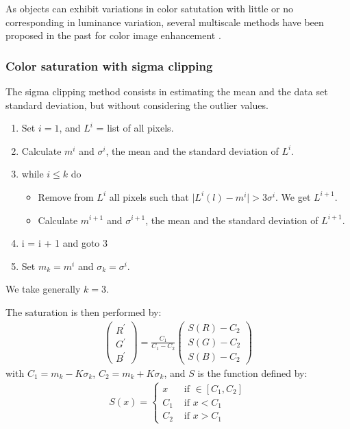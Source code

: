 As objects can exhibit variations in color satutation
with little or no corresponding in luminance variation, 
several multiscale methods have been proposed in the past for color image
enhancement \cite{col:toet92}.
 
\subsubsection*{Color saturation with sigma clipping}
The sigma clipping method consists in estimating the mean and the 
data set standard deviation, but without considering the outlier 
values. 
\begin{enumerate}
\item  Set $i=1$, and $L^i$ = list of all pixels.
\item  Calculate $m^i$ and $\sigma^i$, the mean 
       and the standard deviation of $L^i$.
\item  while $i \le k$ do
\begin{itemize}
\item Remove from $L^i$ all pixels such that $ \mid L^i(l) - m^i \mid  > 3\sigma^i$.
We get $L^{i+1}$.  
\item Calculate $m^{i+1}$ and $\sigma^{i+1}$, the mean 
      and the standard deviation of $L^{i+1}$.
\end{itemize}
\item i = i + 1 and goto 3
\item Set $m_k = m^{i}$ and $ \sigma_k =  \sigma^{i}$.
\end{enumerate}
We take generally $k=3$.  

The saturation is then performed by:
\begin{eqnarray}
\left( \begin{array}{c}
R^{'}\\
G^{'}\\
B^{'}
\end{array}\right)  = \frac{C_{1}}{C_{1}-C_{2}} \left( \begin{array}{c}
S(R)-C_{2}\\
S(G)-C_{2}\\
S(B)-C_{2}
\end{array}
\right)
\end{eqnarray}
with $C_1 = m_k - K \sigma_k$, $C_2 = m_k + K \sigma_k$, and $S$ is the
function defined by:
\begin{eqnarray}
S(x) =  \left\{ 
\begin{array}{cc}
 x & \mbox{ if } \in [C_1, C_2] \\
 C_1 & \mbox{ if } x < C_1\\
 C_2 & \mbox{ if } x > C_1
\end{array}\right.
\end{eqnarray}

